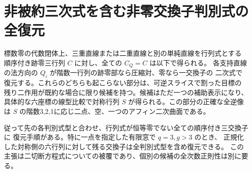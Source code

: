 \section{非被約三次式を含む非零交換子判別式の全復元}
\label{sec:marked-nonreduced-cubic-commutators}
\begin{theorem}\label{thm:marked-nonreduced-cubic-commutators}
標数零の代数閉体上、三重直線または二重直線と別の単純直線を行列式とする
順序付き跡零三行列 $C$ に対し、全ての $C_Q=C$ は以下で得られる。
各支持直線の法方向の $Q_i$ が階数一行列の跡零部なら圧縮対、零なら一交換子の
二次式で復元する。これらのどちらも起こらない部分は、可逆スライスで割った目標の
残り二作用が既約な場合に限り候補を持つ。候補はただ一つの補助表示になり、
具体的な六座標の線型比較で対称行列 $S$ が得られる。この部分の正確な全逆像は
$S$ の階数3,2,1に応じ二点、空、一つのアフィン二次曲面である。

従って先の各判別式型と合わせ、行列式が恒等零でない全ての順序付き三交換子に
復元手順がある。特に一点を指定した有限窓で $q=3,g>3$ のとき、
正規化した対称側の六行列に対して残る交換子は全判別式型を含め復元できる。
この主張は二切断方程式についての被覆であり、個別の候補の全次数正則性は別に要る。
\end{theorem}
